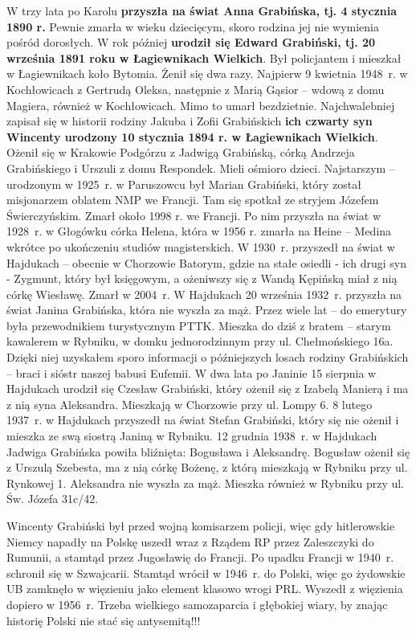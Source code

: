 W trzy lata po Karolu \textbf{przyszła na świat Anna Grabińska, tj. 4 stycznia 1890 r.} Pewnie zmarła w wieku dziecięcym, skoro rodzina jej nie wymienia pośród dorosłych. W rok później \textbf{urodził się Edward Grabiński, tj. 20 września 1891 roku w Łagiewnikach Wielkich}. Był policjantem i mieszkał w Łagiewnikach koło Bytomia. Żenił się dwa razy. Najpierw 9 kwietnia 1948~r. w Kochłowicach z Gertrudą Oleksa, następnie z Marią Gąsior – wdową z domu Magiera, również w Kochłowicach. Mimo to umarł bezdzietnie. 
Najchwalebniej zapisał się w historii rodziny Jakuba i Zofii Grabińskich \textbf{ich czwarty syn Wincenty urodzony 10 stycznia 1894 r. w Łagiewnikach Wielkich}. Ożenił się w Krakowie Podgórzu z Jadwigą Grabińską, córką Andrzeja Grabińskiego i Urszuli z domu Respondek. Mieli ośmioro dzieci. Najstarszym – urodzonym w 1925~r. w Paruszowcu był Marian Grabiński, który został misjonarzem oblatem NMP we Francji. Tam się spotkał ze stryjem Józefem Świerczyńskim. Zmarł około 1998 r. we Francji. Po nim przyszła na świat w 1928~r. w Głogówku córka Helena, która w 1956 r. zmarła na Heine – Medina wkrótce po ukończeniu studiów magisterskich. W 1930~r. przyszedł na świat w Hajdukach – obecnie w Chorzowie Batorym, gdzie na stałe osiedli - ich drugi syn  - Zygmunt, który był księgowym, a ożeniwszy się z Wandą Kępińską miał z nią córkę Wiesławę. Zmarł w 2004~r. W Hajdukach 20 września 1932~r. przyszła na świat Janina Grabińska, która nie wyszła za mąż. Przez wiele lat – do emerytury była przewodnikiem turystycznym PTTK. Mieszka do dziś z bratem – starym kawalerem w Rybniku, w domku jednorodzinnym przy ul. Chełmońskiego 16a. Dzięki niej uzyskałem sporo informacji o późniejszych losach rodziny Grabińskich – braci i sióstr naszej babusi Eufemii. W dwa lata po Janinie 15 sierpnia w Hajdukach urodził się Czesław Grabiński, który ożenił się z Izabelą Manierą i ma z nią syna Aleksandra. Mieszkają w Chorzowie przy ul. Lompy 6. 8 lutego 1937~r. w Hajdukach przyszedł na świat Stefan Grabiński, który się nie ożenił i mieszka ze swą siostrą Janiną w Rybniku. 12 grudnia 1938~r. w Hajdukach Jadwiga Grabińska powiła bliźnięta: Bogusława i Aleksandrę. Bogusław ożenił się z Urszulą Szebesta, ma z nią córkę Bożenę, z którą mieszkają w Rybniku przy ul. Rynkowej 1. Aleksandra nie wyszła za mąż. Mieszka również w Rybniku przy ul. Św. Józefa 31c/42.

Wincenty Grabiński był przed wojną komisarzem policji, więc gdy hitlerowskie Niemcy napadły na Polskę uszedł wraz z Rządem RP przez Zaleszczyki do Rumunii, a stamtąd przez Jugosławię do Francji. Po upadku Francji w 1940~r. schronił się w Szwajcarii. Stamtąd wrócił w 1946~r. do Polski, więc go żydowskie UB zamknęło w więzieniu jako element klasowo wrogi PRL. Wyszedł z więzienia dopiero w 1956~r. Trzeba wielkiego samozaparcia i głębokiej wiary, by znając historię Polski nie stać się antysemitą!!!

